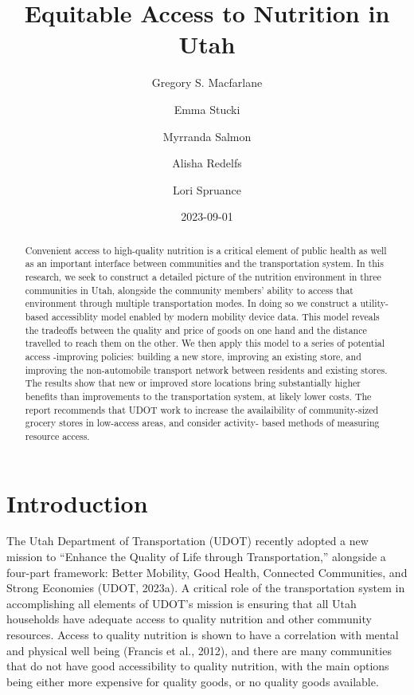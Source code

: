 \documentclass[
  letterpaper,
  DIV=11,
  numbers=noendperiod]{scrreport}
\title{Equitable Access to Nutrition in Utah}
\author{Gregory S. Macfarlane \and Emma Stucki \and Myrranda
Salmon \and Alisha Redelfs \and Lori Spruance}
\date{2023-09-01}
\renewcommand*\contentsname{Table of contents}
\newcommand\contentsname{Table of contents}
\begin{document}
\maketitle
\begin{abstract}
Convenient access to high-quality nutrition is a critical element of
public health as well as an important interface between communities and
the transportation system. In this research, we seek to construct a
detailed picture of the nutrition environment in three communities in
Utah, alongside the community members' ability to access that
environment through multiple transportation modes. In doing so we
construct a utility-based accessiblity model enabled by modern mobility
device data. This model reveals the tradeoffs between the quality and
price of goods on one hand and the distance travelled to reach them on
the other. We then apply this model to a series of potential access
-improving policies: building a new store, improving an existing store,
and improving the non-automobile transport network between residents and
existing stores. The results show that new or improved store locations
bring substantially higher benefits than improvements to the
transportation system, at likely lower costs. The report recommends that
UDOT work to increase the availaibility of community-sized grocery
stores in low-access areas, and consider activity- based methods of
measuring resource access.
\end{abstract}
\ifdefined\Shaded\renewenvironment{Shaded}{\begin{tcolorbox}[borderline west={3pt}{0pt}{shadecolor}, boxrule=0pt, enhanced, sharp corners, frame hidden, interior hidden, breakable]}{\end{tcolorbox}}\fi

\renewcommand*\contentsname{Table of contents}
{
\hypersetup{linkcolor=}
\setcounter{tocdepth}{2}
\tableofcontents
}

\hypertarget{introduction}{%
\chapter{Introduction}\label{introduction}}

The Utah Department of Transportation (UDOT) recently adopted a new
mission to ``Enhance the Quality of Life through Transportation,''
alongside a four-part framework: Better Mobility, Good Health, Connected
Communities, and Strong Economies (UDOT, 2023a). A critical role of the
transportation system in accomplishing all elements of UDOT's mission is
ensuring that all Utah households have adequate access to quality
nutrition and other community resources. Access to quality nutrition is
shown to have a correlation with mental and physical well being (Francis
et al., 2012), and there are many communities that do not have good
accessibility to quality nutrition, with the main options being either
more expensive for quality goods, or no quality goods available.
\end{document}
